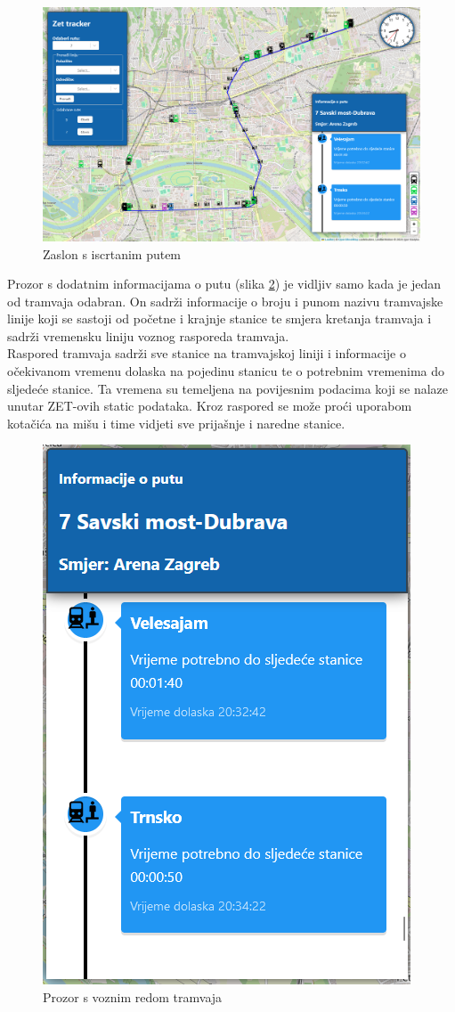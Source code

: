 \documentclass[zavrsnirad]{fer}
\begin{document}
\begin{figure}[H]
	\centering
	\includegraphics[width=\linewidth]{Figures/primjer1.png} 
	\caption{Zaslon s iscrtanim putem}
	\label{slk:put}
\end{figure}
\newpage
Prozor s dodatnim informacijama o putu (slika \ref{slk:inf}) je vidljiv samo kada je jedan od tramvaja odabran. On sadrži informacije o broju i punom nazivu tramvajske linije koji se sastoji od početne i krajnje stanice te smjera kretanja tramvaja i sadrži vremensku liniju voznog rasporeda tramvaja.\\

Raspored tramvaja sadrži sve stanice na tramvajskoj liniji i informacije o očekivanom vremenu dolaska na pojedinu stanicu te o potrebnim vremenima do sljedeće stanice. Ta vremena su temeljena na povijesnim podacima koji se nalaze unutar ZET-ovih static podataka. Kroz raspored se može proći uporabom kotačića na mišu i time vidjeti sve prijašnje i naredne stanice.

\begin{figure}[H]
	\centering
	\includegraphics[width=0.4\linewidth]{Figures/informacije.png} 
	\caption{Prozor s voznim redom tramvaja}
	\label{slk:inf}
\end{figure}
\end{document}
